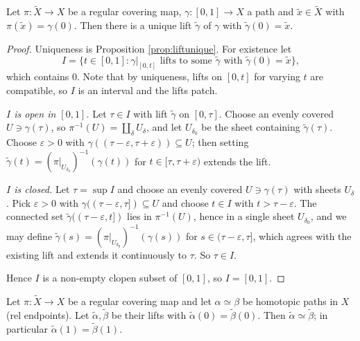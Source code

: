 \documentclass[a4paper]{scrartcl}
\begin{document}
\begin{proposition}\label{prop:pathlifting}
	Let $\pi : \tilde X \to X$ be a regular covering map, $\gamma : [0,1] \to X$ a path
	and $\tilde x \in \tilde X$ with $\pi(\tilde x) = \gamma(0)$. Then there is a unique
	lift $\tilde\gamma$ of $\gamma$ with $\tilde\gamma(0) = \tilde x$.
\end{proposition}

\begin{proof}
	Uniqueness is Proposition \ref{prop:liftunique}. For existence let
	$$
	I = \{ t \in [0,1] : \gamma|_{[0,t]} \text{ lifts to some } \tilde\gamma \text{ with } \tilde\gamma(0) = \tilde x\},
	$$
	which contains $0$. Note that by uniqueness, lifts on $[0,t]$ for varying $t$ are
	compatible, so $I$ is an interval and the lifts patch.

	\emph{$I$ is open in $[0,1]$.} Let $\tau \in I$ with lift $\tilde\gamma$ on $[0,\tau]$.
	Choose an evenly covered $U \ni \gamma(\tau)$, so $\pi^{-1}(U) = \coprod_\delta U_\delta$,
	and let $U_{\delta_0}$ be the sheet containing $\tilde\gamma(\tau)$. Choose
	$\varepsilon > 0$ with $\gamma((\tau - \varepsilon, \tau+\varepsilon)) \subseteq U$;
	then setting $\tilde\gamma(t) = (\pi|_{U_{\delta_0}})^{-1}(\gamma(t))$ for
	$t \in [\tau, \tau + \varepsilon)$ extends the lift.

	\emph{$I$ is closed.} Let $\tau = \sup I$ and choose an evenly covered $U \ni \gamma(\tau)$
	with sheets $U_\delta$. Pick $\varepsilon > 0$ with
	$\gamma((\tau-\varepsilon,\tau]) \subseteq U$ and choose $t \in I$ with
	$t > \tau - \varepsilon$. The connected set $\tilde\gamma((\tau - \varepsilon, t])$ lies
	in $\pi^{-1}(U)$, hence in a single sheet $U_{\delta_0}$, and we may define
	$\tilde\gamma(s) = (\pi|_{U_{\delta_0}})^{-1}(\gamma(s))$ for
	$s \in (\tau - \varepsilon, \tau]$, which agrees with the existing lift and extends it
	continuously to $\tau$. So $\tau \in I$.

	Hence $I$ is a non-empty clopen subset of $[0,1]$, so $I = [0,1]$.
\end{proof}

\begin{theorem}\label{thm:homotopylifting}
	Let $\pi : \tilde X \to X$ be a regular covering map and let $\alpha \simeq \beta$ be
	homotopic paths in $X$ (rel endpoints). Let $\tilde\alpha, \tilde\beta$ be their lifts
	with $\tilde\alpha(0) = \tilde\beta(0)$. Then $\tilde\alpha \simeq \tilde\beta$; in
	particular $\tilde\alpha(1) = \tilde\beta(1)$.
\end{theorem}
\end{document}
